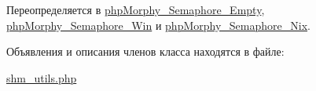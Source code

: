 Переопределяется в \hyperlink{classphpMorphy__Semaphore__Empty_a9cb68d7aec4b6eaf556b53bf4a72684a}{phpMorphy\_\-Semaphore\_\-Empty}, \hyperlink{classphpMorphy__Semaphore__Win_a4443161bd6f484f530ab92a8b0b5b15c}{phpMorphy\_\-Semaphore\_\-Win} и \hyperlink{classphpMorphy__Semaphore__Nix_a23a8bc6e01b42892d6127a1daa052dd6}{phpMorphy\_\-Semaphore\_\-Nix}.



Объявления и описания членов класса находятся в файле:\begin{DoxyCompactItemize}
\item 
\hyperlink{shm__utils_8php}{shm\_\-utils.php}\end{DoxyCompactItemize}
